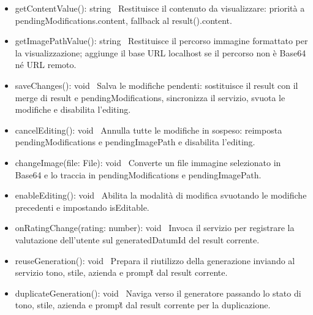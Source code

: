 \documentclass[a4paper,11pt]{article}
\begin{document}
\begin{itemize}[noitemsep, topsep=0pt]
\item getContentValue(): string \
Restituisce il contenuto da visualizzare: priorità a pendingModifications.content, fallback al result().content.

\item getImagePathValue(): string \
Restituisce il percorso immagine formattato per la visualizzazione; aggiunge il base URL localhost se il percorso non è Base64 né URL remoto.

\item saveChanges(): void \
Salva le modifiche pendenti: sostituisce il result con il merge di result e pendingModifications, sincronizza il servizio, svuota le modifiche e disabilita l'editing.

\item cancelEditing(): void \
Annulla tutte le modifiche in sospeso: reimposta pendingModifications e pendingImagePath e disabilita l'editing.

\item changeImage(file: File): void \
Converte un file immagine selezionato in Base64 e lo traccia in pendingModifications e pendingImagePath.

\item enableEditing(): void \
Abilita la modalità di modifica svuotando le modifiche precedenti e impostando isEditable.

\item onRatingChange(rating: number): void \
Invoca il servizio per registrare la valutazione dell'utente sul generatedDatumId del result corrente.

\item reuseGeneration(): void \
Prepara il riutilizzo della generazione inviando al servizio tono, stile, azienda e prompt\G{} dal result corrente.

\item duplicateGeneration(): void \
Naviga verso il generatore passando lo stato di tono, stile, azienda e prompt\G{} dal result corrente per la duplicazione.
\end{itemize}
\end{document}
